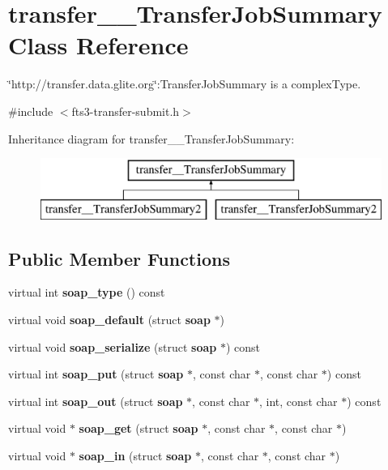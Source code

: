 \section{transfer\_\-\_\-TransferJobSummary Class Reference}
\label{classtransfer____TransferJobSummary}


\char`\"{}http://transfer.data.glite.org\char`\"{}:TransferJobSummary is a complexType.  




{\ttfamily \#include $<$fts3-\/transfer-\/submit.h$>$}

Inheritance diagram for transfer\_\-\_\-TransferJobSummary:\begin{figure}[H]
\begin{center}
\leavevmode
\includegraphics[height=2.000000cm]{classtransfer____TransferJobSummary}
\end{center}
\end{figure}
\subsection*{Public Member Functions}
\begin{DoxyCompactItemize}
\item 
virtual int {\bfseries soap\_\-type} () const \label{classtransfer____TransferJobSummary_a2f8087d179233d73e8bfe981102be26d}

\item 
virtual void {\bfseries soap\_\-default} (struct {\bf soap} $\ast$)\label{classtransfer____TransferJobSummary_a34c4825f129ed7b43e30a415bde880be}

\item 
virtual void {\bfseries soap\_\-serialize} (struct {\bf soap} $\ast$) const \label{classtransfer____TransferJobSummary_a0e2c17378ba0c34ba5b252489010be65}

\item 
virtual int {\bfseries soap\_\-put} (struct {\bf soap} $\ast$, const char $\ast$, const char $\ast$) const \label{classtransfer____TransferJobSummary_a6b0dfa6e1e0d7287aa1928576f3e5a44}

\item 
virtual int {\bfseries soap\_\-out} (struct {\bf soap} $\ast$, const char $\ast$, int, const char $\ast$) const \label{classtransfer____TransferJobSummary_a3041041bbe2df7e15ce159d144c2b133}

\item 
virtual void $\ast$ {\bfseries soap\_\-get} (struct {\bf soap} $\ast$, const char $\ast$, const char $\ast$)\label{classtransfer____TransferJobSummary_afe19deb1a2e3c1ac3d41b6680f9025d7}

\item 
virtual void $\ast$ {\bfseries soap\_\-in} (struct {\bf soap} $\ast$, const char $\ast$, const char $\ast$)\label{classtransfer____TransferJobSummary_ad8c54d84b5f57f05936a6626f9941257}

\end{DoxyCompactItemize}
